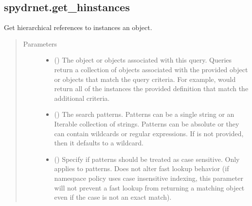 \documentclass[letterpaper,10pt,english,openany,oneside]{sphinxmanual}
\begin{document}
\subsection{spydrnet.get\_hinstances}
\label{\detokenize{reference/classes/generated/spydrnet.get_hinstances:spydrnet-get-hinstances}}\label{\detokenize{reference/classes/generated/spydrnet.get_hinstances::doc}}

\begin{fulllineitems}
\label{\detokenize{reference/classes/generated/spydrnet.get_hinstances:spydrnet.get_hinstances}}
Get hierarchical references to instances  an object.
\begin{quote}\begin{description}
\item[{Parameters}] \leavevmode\begin{itemize}
\item {} 
 () \textendash{} The object or objects associated with this query. Queries return a collection of objects associated with the
provided object or objects that match the query criteria. For example,  would
return all of the instances  the provided definition that match the additional criteria.

\item {} 
 () \textendash{} The search patterns. Patterns can be a single string or an Iterable collection of strings. Patterns can be
absolute or they can contain wildcards or regular expressions. If  is not provided, then it defaults
to a wildcard.

\item {} 
 () \textendash{} Specify if patterns should be treated as case sensitive. Only applies to patterns. Does not alter fast lookup
behavior (if namespace policy uses case insensitive indexing, this parameter will not prevent a fast lookup
from returning a matching object even if the case is not an exact match).


\end{itemize}
\end{description}
\end{quote}
\end{fulllineitems}
\end{document}
